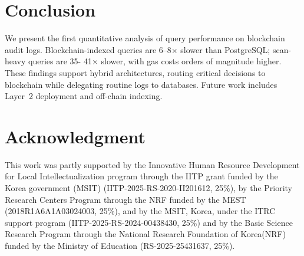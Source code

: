 \documentclass[conference]{IEEEtran}
\begin{document}
\section{Conclusion}
We present the first quantitative analysis of query performance on blockchain audit logs. Blockchain-indexed queries are 6--8$\times$ slower than PostgreSQL; scan-heavy queries are 35- 41$\times$ slower, with gas costs orders of magnitude higher. These findings support hybrid architectures, routing critical decisions to blockchain while delegating routine logs to databases. Future work includes Layer~2 deployment and off-chain indexing.


\section*{Acknowledgment}
This work was partly supported by the Innovative Human Resource Development for Local Intellectualization program through the IITP grant funded by the Korea government (MSIT) (IITP-2025-RS-2020-II201612, 25\%), by the Priority Research Centers Program through the NRF funded by the MEST (2018R1A6A1A03024003, 25\%), and by the MSIT, Korea, under the ITRC support program (IITP-2025-RS-2024-00438430, 25\%) and by the Basic Science Research Program through the National Research Foundation of Korea(NRF) funded by the Ministry of Education (RS-2025-25431637, 25\%).



\end{document}

